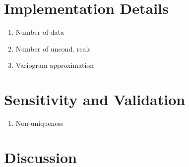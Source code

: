 \FloatBarrier
\section{Implementation Details}
\label{sec:implementd}

\begin{enumerate}[noitemsep]
    \item Number of data
    \item Number of uncond. reals
    \item Variogram approximation
\end{enumerate}


\FloatBarrier
\section{Sensitivity and Validation}
\label{sec:valid}

\begin{enumerate}[noitemsep]
    \item Non-uniqueness
\end{enumerate}


\FloatBarrier
\section{Discussion}
\label{sec:discuss04}
